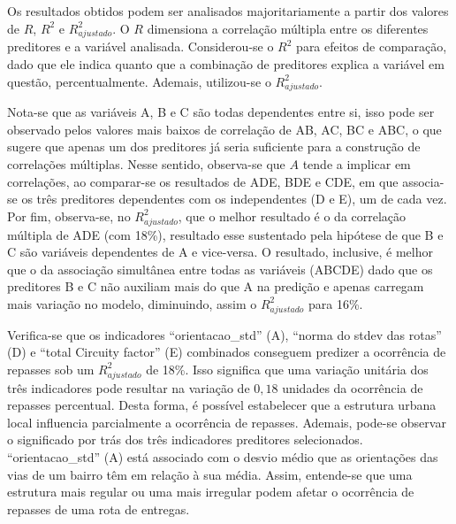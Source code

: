 Os resultados obtidos podem ser analisados majoritariamente a partir dos valores de $R$, $R^{2}$ e $R^{2}_{ajustado}$. 
O $R$ dimensiona a correlação múltipla entre os diferentes preditores e a variável analisada. 
Considerou-se o $R^{2}$ para efeitos de comparação, dado que ele indica quanto que a combinação de preditores explica a variável em questão, percentualmente. 
Ademais, utilizou-se o $R^{2}_{ajustado}$. 

Nota-se que as variáveis A, B e C são todas dependentes entre si, isso pode ser observado pelos valores mais baixos de correlação de AB, AC, BC e ABC, o que sugere que apenas um dos preditores já seria suficiente para a construção de correlações múltiplas.
Nesse sentido, observa-se que $A$ tende a implicar em correlações, ao comparar-se os resultados de ADE, BDE e CDE, em que associa-se os três preditores dependentes com os independentes (D e E), um de cada vez. 
Por fim, observa-se, no $R^{2}_{ajustado}$, que o melhor resultado é o da correlação múltipla de ADE (com 18\%), resultado esse sustentado pela hipótese de que B e C são variáveis dependentes de A e vice-versa. %
O resultado, inclusive, é melhor que o da associação simultânea entre todas as variáveis (ABCDE) dado que os preditores B e C não auxiliam mais do que A na predição e apenas carregam mais variação no modelo, diminuindo, assim o $R^{2}_{ajustado}$ para 16\%.

Verifica-se que os indicadores ``orientacao\_std'' (A), ``norma do stdev das rotas'' (D) e ``total Circuity factor'' (E) combinados conseguem predizer a ocorrência de repasses sob um $R^{2}_{ajustado}$ de 18\%.
Isso significa que uma variação unitária dos três indicadores pode resultar na variação de $0,18$ unidades da ocorrência de repasses percentual. 
Desta forma, é possível estabelecer que a estrutura urbana local influencia parcialmente a ocorrência de repasses.
%
Ademais, pode-se observar o significado por trás dos três indicadores preditores selecionados. 
``orientacao\_std'' (A) está associado com o desvio médio que as orientações das vias de um bairro têm em relação à sua média.
Assim, entende-se que uma estrutura mais regular ou uma mais irregular podem afetar o ocorrência de repasses de uma rota de entregas.

